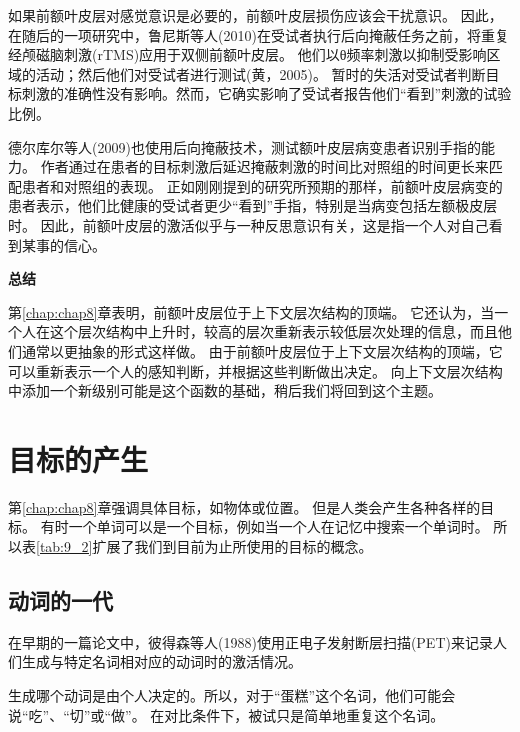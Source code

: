 如果前额叶皮层对感觉意识是必要的，前额叶皮层损伤应该会干扰意识。
因此，在随后的一项研究中，鲁尼斯等人(2010)在受试者执行后向掩蔽任务之前，将重复经颅磁脑刺激(rTMS)应用于双侧前额叶皮层。
他们以θ频率刺激以抑制受影响区域的活动；然后他们对受试者进行测试(黄，2005)。
暂时的失活对受试者判断目标刺激的准确性没有影响。然而，它确实影响了受试者报告他们“看到”刺激的试验比例。
\par


德尔库尔等人(2009)也使用后向掩蔽技术，测试额叶皮层病变患者识别手指的能力。
作者通过在患者的目标刺激后延迟掩蔽刺激的时间比对照组的时间更长来匹配患者和对照组的表现。
正如刚刚提到的研究所预期的那样，前额叶皮层病变的患者表示，他们比健康的受试者更少“看到”手指，特别是当病变包括左额极皮层时。
因此，前额叶皮层的激活似乎与一种反思意识有关，这是指一个人对自己看到某事的信心。
\par


\textbf{总结}
\par

第\ref{chap:chap8}章表明，前额叶皮层位于上下文层次结构的顶端。
它还认为，当一个人在这个层次结构中上升时，较高的层次重新表示较低层次处理的信息，而且他们通常以更抽象的形式这样做。
由于前额叶皮层位于上下文层次结构的顶端，它可以重新表示一个人的感知判断，并根据这些判断做出决定。
向上下文层次结构中添加一个新级别可能是这个函数的基础，稍后我们将回到这个主题。



\section{目标的产生}
\par

第\ref{chap:chap8}章强调具体目标，如物体或位置。
但是人类会产生各种各样的目标。
有时一个单词可以是一个目标，例如当一个人在记忆中搜索一个单词时。
所以表\ref{tab:9_2}扩展了我们到目前为止所使用的目标的概念。



\subsection{动词的一代}
\par
在早期的一篇论文中，彼得森等人(1988)使用正电子发射断层扫描(PET)来记录人们生成与特定名词相对应的动词时的激活情况。
\par

生成哪个动词是由个人决定的。所以，对于“蛋糕”这个名词，他们可能会说“吃”、“切”或“做”。
在对比条件下，被试只是简单地重复这个名词。
\par

